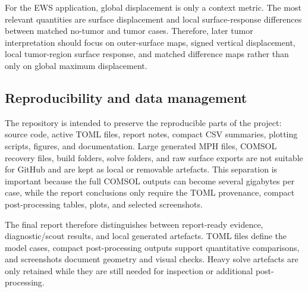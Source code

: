 For the EWS application, global displacement is only a context metric. The most relevant quantities are surface displacement and local surface-response differences between matched no-tumor and tumor cases. Therefore, later tumor interpretation should focus on outer-surface maps, signed vertical displacement, local tumor-region surface response, and matched difference maps rather than only on global maximum displacement.

\subsection{Reproducibility and data management}

The repository is intended to preserve the reproducible parts of the project: source code, active TOML files, report notes, compact CSV summaries, plotting scripts, figures, and documentation. Large generated MPH files, COMSOL recovery files, build folders, solve folders, and raw surface exports are not suitable for GitHub and are kept as local or removable artefacts. This separation is important because the full COMSOL outputs can become several gigabytes per case, while the report conclusions only require the TOML provenance, compact post-processing tables, plots, and selected screenshots.

The final report therefore distinguishes between report-ready evidence, diagnostic/scout results, and local generated artefacts. TOML files define the model cases, compact post-processing outputs support quantitative comparisons, and screenshots document geometry and visual checks. Heavy solve artefacts are only retained while they are still needed for inspection or additional post-processing.
